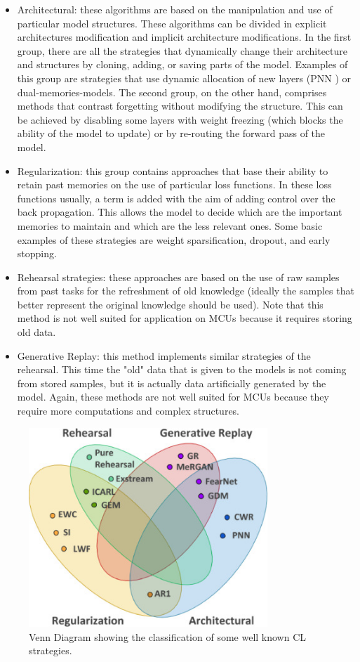 \documentclass[12pt]{report}
\begin{document}
\begin{itemize}
\item Architectural: these algorithms are based on the manipulation and use of particular model structures. These algorithms can be divided in explicit architectures modification and implicit architecture modifications. In the first group, there are all the strategies that dynamically change their architecture and structures by cloning, adding, or saving parts of the model. Examples of this group are strategies that use dynamic allocation of new layers (PNN \cite{rusu2016progressive}) or dual-memories-models. The second group, on the other hand, comprises methods that contrast forgetting without modifying the structure. This can be achieved by disabling some layers with weight freezing (which blocks the ability of the model to update) or by re-routing the forward pass of the model.
\item Regularization: this group contains approaches that base their ability to retain past memories on the use of particular loss functions. In these loss functions usually, a term is added with the aim of adding control over the back propagation. This allows the model to decide which are the important memories to maintain and which are the less relevant ones. Some basic examples of these strategies are weight sparsification, dropout, and early stopping.
\item Rehearsal strategies: these approaches are based on the use of raw samples from past tasks for the refreshment of old knowledge (ideally the samples that better represent the original knowledge should be used). Note that this method is not well suited for application on MCUs because it requires storing old data. 
\item Generative Replay: this method implements similar strategies of the rehearsal. This time the "old" data that is given to the models is not coming from stored samples, but it is actually data artificially generated by the model. Again, these methods are not well suited for MCUs because they require more computations and complex structures. 
\end{itemize} 

\begin{figure}[h!]
    \centering
    \includegraphics[width=90mm]{Figures/Chapter1/CL_algorithms.jpg} 
    \caption{Venn Diagram showing the classification of some well known CL strategies.}
    \label{fig:CLstrategies}    
\end{figure}  
\end{document}
